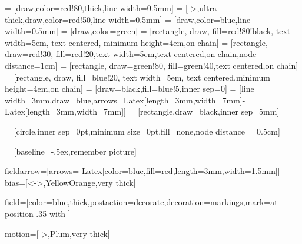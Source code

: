  = [draw,color=red!80,thick,line width=0.5mm]
 = [->,ultra thick,draw,color=red!50,line width=0.5mm]
 = [draw,color=blue,line width=0.5mm]
 = [draw,color=green]
 = [rectangle, draw, fill=red!80!black, text width=5em, text centered, minimum height=4em,on chain]
 = [rectangle, draw=red!30, fill=red!20,text width=5em,text centered,on chain,node distance=1cm]
 = [rectangle, draw=green!80, fill=green!40,text centered,on chain]
 = [rectangle, draw, fill=blue!20, text width=5em, text centered,minimum height=4em,on chain]
 = [draw=black,fill=blue!5,inner sep=0]
 = [line width=3mm,draw=blue,arrows={Latex[length=3mm,width=7mm]-Latex[length=3mm,width=7mm]}]
 = [rectangle,draw=black,inner sep=5mm]



 = [circle,inner sep=0pt,minimum size=0pt,fill=none,node distance = 0.5cm]

 = [baseline=-.5ex,remember picture]

\newcommand{\matlab}{MATLAB\xspace}

\newcommand{\cubesat}[2]{
    \draw (#1:#2) node{\pgftext[rotate=#1]{\texttt{[image: cube-icon]}}};
    \draw[->,cyan,thick] (#1:#2) -- +(#1+90:\axlen);
    \draw (#1:#2) ++(#1+90:\axlen) node[rotate=#1-90,anchor=south west] {\tiny +Y};
    \draw[->,red,thick] (#1:#2) -- +(#1:\axlen);
    \draw (#1:#2) ++(#1:\axlen) node[rotate=#1-90,anchor=north west] {\tiny -Z};
}

\tikzstyle fieldarrow=[arrows={-Latex[color=blue,fill=red,length=3mm,width=1.5mm]}]  %
\tikzstyle bias=[<->,YellowOrange,very thick]                                        %

\tikzstyle field=[color=blue,thick,postaction={decorate,decoration={markings,mark=at position .35 with {}}}]

\tikzstyle motion=[->,Plum,very thick]

